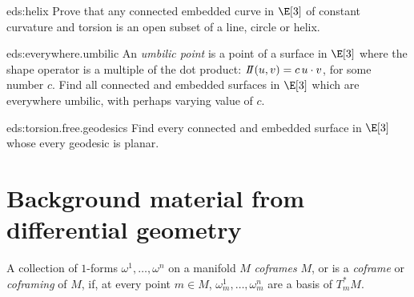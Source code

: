 \begin{problem}{eds:helix}
Prove that any connected embedded curve in \(\E[3]\) of constant curvature and torsion is an open subset of a line, circle or helix.
\end{problem}
\begin{problem}{eds:everywhere.umbilic}
An \emph{umbilic point} is a point of a surface in \(\E[3]\) where the shape operator is a multiple of the dot product: \(\shapeOp(u,v)=c \,u\cdot v\), for some number \(c\).
Find all connected and embedded surfaces in \(\E[3]\) which are everywhere umbilic, with perhaps varying value of \(c\).
\end{problem}
\begin{problem}{eds:torsion.free.geodesics}
Find every connected and embedded surface in \(\E[3]\) whose every geodesic is planar.
\end{problem}

\section{Background material from differential geometry}
A collection of \(1\)-forms \(\omega^1,\dots,\omega^n\) on a manifold \(M\) \emph{coframes} \(M\), or is a \emph{coframe} or \emph{coframing} of \(M\), if, at every point \(m \in M\), \(\omega^1_m,\dots,\omega^n_m\) are a basis of \(T^*_m M\).

